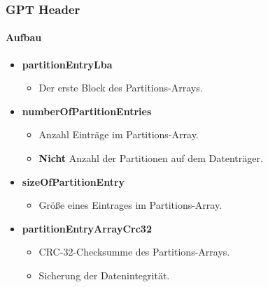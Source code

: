\begin{frame}
    \frametitle{GPT Header}
    \framesubtitle{Aufbau}

    \begin{itemize}
        \item \textbf{partitionEntryLba}
        \begin{itemize}
            \item Der erste Block des Partitions-Arrays.
        \end{itemize}

        \pause
        \item \textbf{numberOfPartitionEntries}
        \begin{itemize}
            \item Anzahl Einträge im Partitions-Array.
            \item \textbf{Nicht} Anzahl der Partitionen auf dem Datenträger.
        \end{itemize}

        \pause
        \item \textbf{sizeOfPartitionEntry}
        \begin{itemize}
            \item Größe eines Eintrages im Partitions-Array.
        \end{itemize}

        \pause
        \item \textbf{partitionEntryArrayCrc32}
        \begin{itemize}
            \item CRC-32-Checksumme des Partitions-Arrays.
            \item Sicherung der Datenintegrität.
        \end{itemize}
    \end{itemize}
\end{frame}
